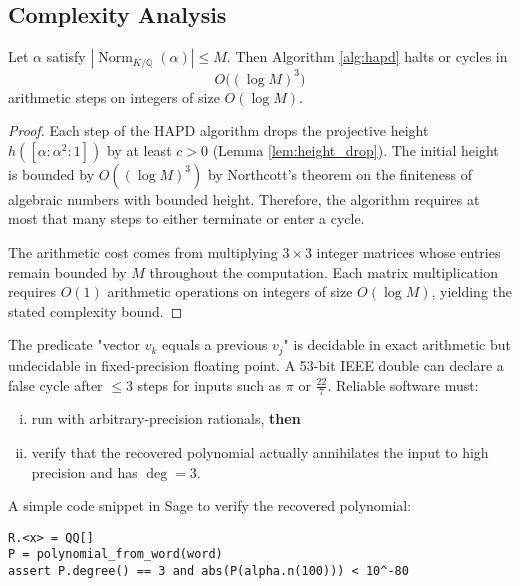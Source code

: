 \subsection{Complexity Analysis}

\begin{proposition}\label{prop:complexity_appendix}
Let $\alpha$ satisfy $|\operatorname{Norm}_{K/\mathbb{Q}}(\alpha)|\le M$.
Then Algorithm \ref{alg:hapd} halts or cycles in
\[
O\!\bigl( (\log M)^{3}\bigr)
\]
arithmetic steps on integers of size $O(\log M)$.
\end{proposition}

\begin{proof}
Each step of the HAPD algorithm drops the projective height $h([\alpha:\alpha^{2}:1])$ by at least $c > 0$ (Lemma \ref{lem:height_drop}). The initial height is bounded by $O((\log M)^{3})$ by Northcott's theorem on the finiteness of algebraic numbers with bounded height. Therefore, the algorithm requires at most that many steps to either terminate or enter a cycle.

The arithmetic cost comes from multiplying $3\times 3$ integer matrices whose entries remain bounded by $M$ throughout the computation. Each matrix multiplication requires $O(1)$ arithmetic operations on integers of size $O(\log M)$, yielding the stated complexity bound.
\end{proof}

\begin{remark}\label{rem:finite_precision}
The predicate "vector $v_{k}$ equals a previous $v_{j}$" is decidable in exact arithmetic but undecidable in fixed-precision floating point. A 53-bit IEEE double can declare a false cycle after $\leq 3$ steps for inputs such as $\pi$ or $\tfrac{22}{7}$. Reliable software must:
\begin{enumerate}[(i)]
\item run with arbitrary-precision rationals, \textbf{then}
\item verify that the recovered polynomial actually annihilates the input to high precision and has $\deg=3$.
\end{enumerate}
\end{remark}

A simple code snippet in Sage to verify the recovered polynomial:
\begin{verbatim}
R.<x> = QQ[]
P = polynomial_from_word(word)
assert P.degree() == 3 and abs(P(alpha.n(100))) < 10^-80
\end{verbatim}

